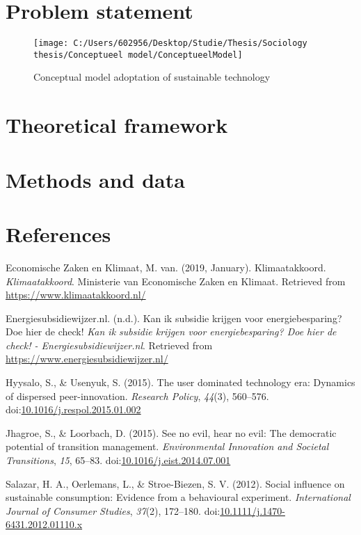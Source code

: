 \documentclass[english,man,doc,11pt, twoside,floatsintext]{apa6}
\begin{document}
\section{Problem statement}\label{problem-statement}

\begin{figure}

{\centering \texttt{[image: C:/Users/602956/Desktop/Studie/Thesis/Sociology thesis/Conceptueel model/ConceptueelModel]} 

}

\caption{Conceptual model adoptation of sustainable technology}\label{fig:knit}
\end{figure}

\section{Theoretical framework}\label{theoretical-framework}

\section{Methods and data}\label{methods-and-data}

\newpage

\section{References}\label{references}

\begingroup
\setlength{\parindent}{-0.5in} \setlength{\leftskip}{0.5in}

\hypertarget{refs}{}
\hypertarget{ref-klimaat_2019}{}
Economische Zaken en Klimaat, M. van. (2019, January). Klimaatakkoord.
\emph{Klimaatakkoord}. Ministerie van Economische Zaken en Klimaat.
Retrieved from \url{https://www.klimaatakkoord.nl/}

\hypertarget{ref-energiesubsidiewijzer}{}
Energiesubsidiewijzer.nl. (n.d.). Kan ik subsidie krijgen voor
energiebesparing? Doe hier de check! \emph{Kan ik subsidie krijgen voor
energiebesparing? Doe hier de check! - Energiesubsidiewijzer.nl}.
Retrieved from \url{https://www.energiesubsidiewijzer.nl/}

\hypertarget{ref-hyysalo_2015}{}
Hyysalo, S., \& Usenyuk, S. (2015). The user dominated technology era:
Dynamics of dispersed peer-innovation. \emph{Research Policy},
\emph{44}(3), 560--576.
doi:\href{https://doi.org/10.1016/j.respol.2015.01.002}{10.1016/j.respol.2015.01.002}

\hypertarget{ref-jhagroe_2015}{}
Jhagroe, S., \& Loorbach, D. (2015). See no evil, hear no evil: The
democratic potential of transition management. \emph{Environmental
Innovation and Societal Transitions}, \emph{15}, 65--83.
doi:\href{https://doi.org/10.1016/j.eist.2014.07.001}{10.1016/j.eist.2014.07.001}

\hypertarget{ref-salazar_2012}{}
Salazar, H. A., Oerlemans, L., \& Stroe-Biezen, S. V. (2012). Social
influence on sustainable consumption: Evidence from a behavioural
experiment. \emph{International Journal of Consumer Studies},
\emph{37}(2), 172--180.
doi:\href{https://doi.org/10.1111/j.1470-6431.2012.01110.x}{10.1111/j.1470-6431.2012.01110.x}

\endgroup
\end{document}
